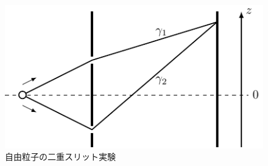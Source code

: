 \documentclass[a4paper,pdflatex,ja=standard]{bxjsarticle}
\begin{document}
\begin{figure}[ht]
  \centering
  \includegraphics{fig/two_slit_free.pdf}
  \caption{自由粒子の二重スリット実験}
  \label{two_slit_free}
\end{figure}
\end{document}
